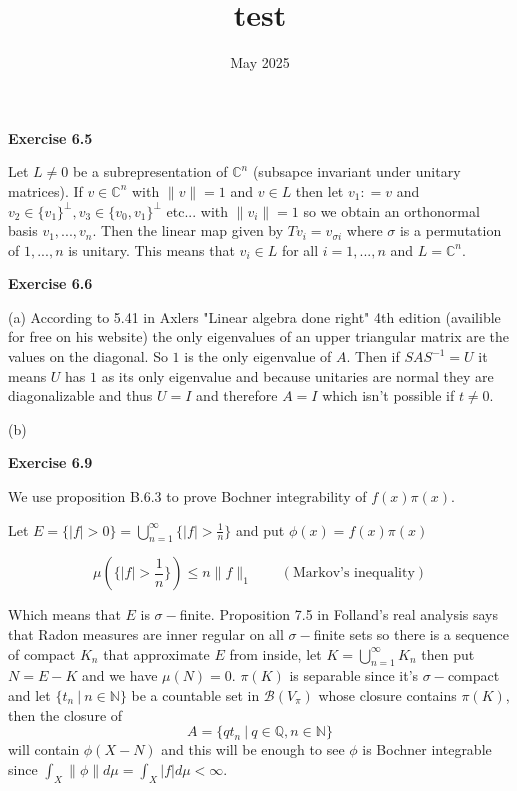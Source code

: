 \documentclass{article}
\title{test}
\date{May 2025}
\begin{document}
\vspace{0.5cm}

\textbf{Exercise 6.5}

\vspace{0.5cm}

Let $L \neq 0$ be a subrepresentation of $\mathbb C^n$ (subsapce invariant under unitary matrices). If $v \in \mathbb C^n$ with $\|v\| = 1$ and $v \in L$ then let $v_1: = v$ and $v_2 \in \{ v_1\}^\perp, v_3 \in \{v_0,v_1\}^\perp$ etc... with $\| v_i\| = 1$ so we obtain an orthonormal basis $v_1,...,v_n$. Then the linear map given by $Tv_i = v_{\sigma i}$ where $\sigma$ is a permutation of $1,...,n$ is unitary. This means that $v_i \in L$ for all $i = 1,...,n$ and $L = \mathbb C^n$.

\vspace{0.5cm}

\textbf{Exercise 6.6}

\vspace{0.5cm}

(a) According to 5.41 in Axlers "Linear algebra done right" 4th edition (availible for free on his website) the only eigenvalues of an upper triangular matrix are the values on the diagonal. So $1$ is the only eigenvalue of $A$. Then if $SAS^{-1} = U$ it means $U$ has $1$ as its only eigenvalue and because unitaries are normal they are diagonalizable and thus $U = I$ and therefore $A = I$ which isn't possible if $t \neq 0$.

(b) 
\vspace{0.5cm}

\textbf{Exercise 6.9}

\vspace{0.5cm}

\noindent We use proposition B.6.3 to prove Bochner integrability of $f(x)\pi(x)$.

\vspace{0.5cm}

Let $E =\{|f| > 0\} = \bigcup\limits_{n = 1}^\infty \{|f| > \frac{1}{n}\}$ and put $\phi(x) = f(x) \pi(x)$

$$\mu(\{|f| > \frac{1}{n}\}) \leq n \|f\|_1 \qquad (\text{Markov's inequality})$$

Which means that $E$ is $\sigma-$finite. Proposition 7.5 in Folland's real analysis says that Radon measures are inner regular on all $\sigma-$finite sets so there is a sequence of compact $K_n$ that approximate $E$ from inside, let $K = \bigcup\limits_{n = 1}^\infty K_n$ then put $N = E - K$ and we have $\mu(N) = 0$. $\pi(K)$ is separable since it's $\sigma-$compact and let $\{t_n \ | \ n \in \mathbb N\}$ be a countable set in $\mathcal B(V_\pi)$ whose closure contains $\pi(K)$, then the closure of 
$$A =\{qt_n \ | \ q \in \mathbb Q, n \in \mathbb N \}$$
will contain $\phi(X - N)$ and this will be enough to see $\phi$ is Bochner integrable since $\int_X \| \phi \| d \mu = \int_X | f| d \mu < \infty$.  
\end{document}
